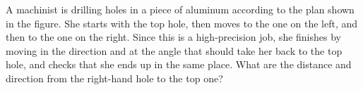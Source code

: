 A machinist is drilling holes in a piece of aluminum
according to the plan shown in the figure. She starts with
the top hole, then moves to the one on the left, and then to
the one on the right. Since this is a high-precision job,
she finishes by moving in the direction and at the angle
that should take her back to the top hole, and checks that
she ends up in the same place. What are the distance and
direction from the right-hand hole to the top one?\answercheck\hwendpart
